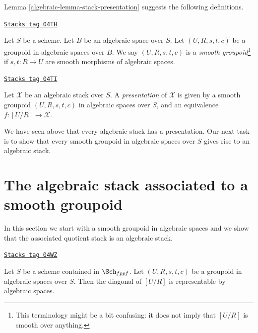 Lemma \ref{algebraic-lemma-stack-presentation}
suggests the following definitions.

\begin{definition}
\label{algebraic-definition-smooth-groupoid}
\href{https://stacks.math.columbia.edu/tag/04TH}{\texttt{Stacks tag 04TH}}

Let $S$ be a scheme. Let $B$ be an algebraic space over $S$.
Let $(U, R, s, t, c)$ be a groupoid in algebraic spaces over $B$.
We say $(U, R, s, t, c)$ is a {\it smooth groupoid}\footnote{This terminology
might be a bit confusing: it does not imply that $[U/R]$ is smooth
over anything.}
if $s, t : R \to U$ are smooth morphisms of algebraic spaces.
\end{definition}

\begin{definition}[Presentation]
\label{algebraic-definition-presentation}
\href{https://stacks.math.columbia.edu/tag/04TI}{\texttt{Stacks tag 04TI}}

Let $\mathcal{X}$ be an algebraic stack over $S$.
A {\it presentation} of $\mathcal{X}$ is given by a smooth groupoid
$(U, R, s, t, c)$ in algebraic spaces over $S$, and an
equivalence $f : [U/R] \to \mathcal{X}$.
\end{definition}

We have seen above that every algebraic stack has a presentation.
Our next task is to show that every smooth groupoid in algebraic
spaces over $S$ gives rise to an algebraic stack.

\section{The algebraic stack associated to a smooth groupoid}
\label{algebraic-section-smooth-groupoid-gives-algebraic-stack}
In this section we start with a smooth groupoid in algebraic spaces
and we show that the associated quotient stack is an algebraic stack.

\begin{lemma}
\label{algebraic-lemma-diagonal-quotient-stack}
\href{https://stacks.math.columbia.edu/tag/04WZ}{\texttt{Stacks tag 04WZ}}

Let $S$ be a scheme contained in $\Sch_{fppf}$.
Let $(U, R, s, t, c)$ be a groupoid in algebraic spaces over $S$.
Then the diagonal of $[U/R]$ is representable by algebraic spaces.
\end{lemma}

